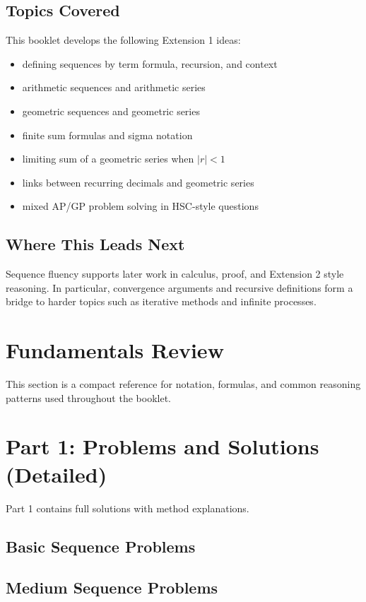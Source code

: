 \documentclass[12pt]{article}
\theoremstyle{definition}
\begin{document}
\subsection{Topics Covered}
This booklet develops the following Extension 1 ideas:
\begin{itemize}[leftmargin=*]
  \item defining sequences by term formula, recursion, and context
  \item arithmetic sequences and arithmetic series
  \item geometric sequences and geometric series
  \item finite sum formulas and sigma notation
  \item limiting sum of a geometric series when $|r|<1$
  \item links between recurring decimals and geometric series
  \item mixed AP/GP problem solving in HSC-style questions
\end{itemize}

\subsection{Where This Leads Next}
Sequence fluency supports later work in calculus, proof, and Extension 2 style reasoning. In particular, convergence arguments and recursive definitions form a bridge to harder topics such as iterative methods and infinite processes.

\newpage
\section{Fundamentals Review}
This section is a compact reference for notation, formulas, and common reasoning patterns used throughout the booklet.



\newpage
\section{Part 1: Problems and Solutions (Detailed)}
Part 1 contains full solutions with method explanations.

\subsection{Basic Sequence Problems}


\subsection{Medium Sequence Problems}

\end{document}
